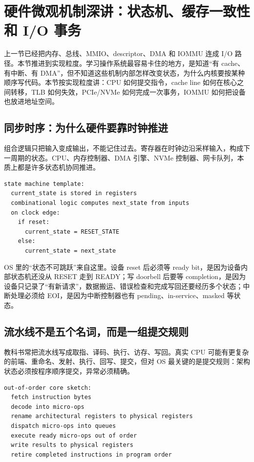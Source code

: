 \section{硬件微观机制深讲：状态机、缓存一致性和 I/O 事务}

上一节已经把内存、总线、MMIO、descriptor、DMA 和 IOMMU 连成 I/O 路径。本节推进到实现粒度。学习操作系统最容易卡住的地方，是知道“有 cache、有中断、有 DMA”，但不知道这些机制内部怎样改变状态，为什么内核要按某种顺序写代码。本节按实现粒度讲：CPU 如何提交指令，cache line 如何在核心之间转移，TLB 如何失效，PCIe/NVMe 如何完成一次事务，IOMMU 如何把设备也放进地址空间。

\subsection{同步时序：为什么硬件要靠时钟推进}

组合逻辑只把输入变成输出，不能记住过去。寄存器在时钟边沿采样输入，构成下一周期的状态。CPU、内存控制器、DMA 引擎、NVMe 控制器、网卡队列，本质上都是许多状态机协同推进。

\begin{lstlisting}
state machine template:
  current_state is stored in registers
  combinational logic computes next_state from inputs
  on clock edge:
    if reset:
      current_state = RESET_STATE
    else:
      current_state = next_state
\end{lstlisting}

OS 里的“状态不可跳跃”来自这里。设备 reset 后必须等 ready bit，是因为设备内部状态机还没从 RESET 走到 READY；写 doorbell 后要等 completion，是因为设备只记录了“有新请求”，数据搬运、错误检查和完成写回还要经历多个状态；中断处理必须给 EOI，是因为中断控制器也有 pending、in-service、masked 等状态。

\subsection{流水线不是五个名词，而是一组提交规则}

教科书常把流水线写成取指、译码、执行、访存、写回。真实 CPU 可能有更复杂的前端、重命名、发射、执行、回写、提交，但对 OS 最关键的是提交规则：架构状态必须按程序顺序提交，异常必须精确。

\begin{lstlisting}
out-of-order core sketch:
  fetch instruction bytes
  decode into micro-ops
  rename architectural registers to physical registers
  dispatch micro-ops into queues
  execute ready micro-ops out of order
  write results to physical registers
  retire completed instructions in program order
\end{lstlisting}

